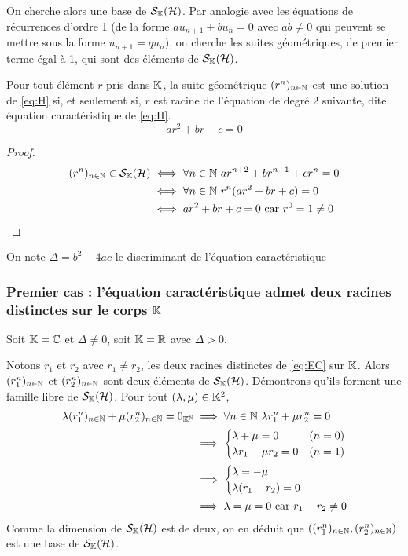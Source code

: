 On cherche alors une base de \(\mathcal{S}_{\mathbb{K}}(\mathcal{H})\). Par analogie avec les équations de 
récurrences d'ordre 1 (de la forme \(au_{n+1}+bu_n =0\) avec \(ab \neq 0\) qui 
peuvent se mettre sous la forme \(u_{n+1}=qu_n\)), on cherche les suites 
géométriques, de premier terme égal à 1, qui sont des éléments de \(\mathcal{S}_{\mathbb{K}}(\mathcal{H})\).

\begin{prop}
  Pour tout élément \(r\) pris dans \(\mathbb{K}\), la suite géométrique \((r^n)_{n \in 
  \mathbb{N}}\) est une solution de \eqref{eq:H} si, et seulement si, \(r\) est racine 
  de l'équation de degré 2 suivante, dite équation caractéristique de 
  \eqref{eq:H}.
  \begin{equation}
    ar^2+br+c=0 \label{eq:EC} \tag{E.C.}
  \end{equation}
\end{prop}
\begin{proof}
  \begin{align}
    (r^n)_{n \in  \N} \in \S_\K(\H) &\iff \forall n \in \N \ ar^{n+2} 
    +br^{n+1}+cr^n = 0 \\
    &\iff \forall n \in \N \ r^n(ar^2+br+c)=0\\
    &\iff ar^2+br+c=0 \text{~car } r^0=1 \neq 0
  \end{align}
\end{proof}

On note \(\Delta=b^2-4ac\) le discriminant de l'équation caractéristique

\subsubsection{Premier cas : l'équation caractéristique admet deux racines 
distinctes sur le corps \(\mathbb{K}\)}

Soit \(\mathbb{K}=\mathbb{C}\) et \(\Delta \neq 0\), soit \(\mathbb{K}=\mathbb{R}\) avec \(\Delta >0\).

Notons \(r_1\) et \(r_2\) avec \(r_1 \neq r_2\), les deux racines distinctes de 
\eqref{eq:EC} sur \(\mathbb{K}\). Alors \((r_1^n)_{n \in \mathbb{N}}\) et \((r_2^n)_{n \in \mathbb{N}}\) 
sont deux éléments de \(\mathcal{S}_{\mathbb{K}}(\mathcal{H})\). Démontrons qu'ils forment une famille libre 
de \(\mathcal{S}_{\mathbb{K}}(\mathcal{H})\). Pour tout \((\lambda, \mu) \in \mathbb{K}^2\),
\begin{align}
  \lambda (r_1^n)_{n \in \mathbb{N}} + \mu (r_2^n)_{n \in \mathbb{N}} = 0_{\mathbb{K}^{\mathbb{N}}} &\implies 
  \forall n \in \mathbb{N} \ \lambda r_1^n + \mu r_2^n=0\\
  &\implies \begin{cases} \lambda + \mu =0 & (n=0) \\ \lambda r_1 +\mu r_2 = 0 & 
  (n=1) \end{cases}\\
  &\implies \begin{cases} \lambda = -\mu \\ \lambda(r_1-r_2)=0 \end{cases}\\
    &\implies \lambda=\mu=0 \text{~car } r_1-r_2 \neq 0
\end{align}
Comme la dimension de \(\mathcal{S}_{\mathbb{K}}(\mathcal{H})\) est de deux, on en déduit que \(((r_1^n)_{n 
\in \mathbb{N}},(r_2^n)_{n \in \mathbb{N}})\) est une base de \(\mathcal{S}_{\mathbb{K}}(\mathcal{H})\).

